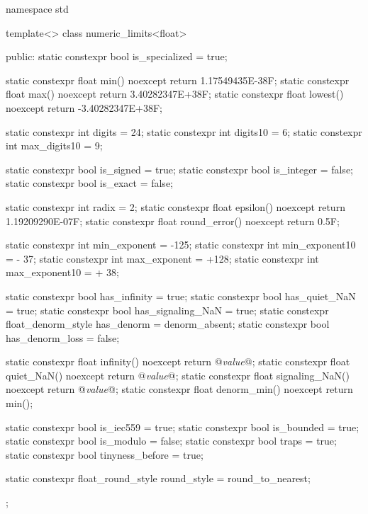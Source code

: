 \pnum
\begin{example}
\begin{codeblock}
namespace std {
  template<> class numeric_limits<float> {
  public:
    static constexpr bool is_specialized = true;

    static constexpr float min() noexcept { return 1.17549435E-38F; }
    static constexpr float max() noexcept { return 3.40282347E+38F; }
    static constexpr float lowest() noexcept { return -3.40282347E+38F; }

    static constexpr int digits   = 24;
    static constexpr int digits10 =  6;
    static constexpr int max_digits10 =  9;

    static constexpr bool is_signed  = true;
    static constexpr bool is_integer = false;
    static constexpr bool is_exact   = false;

    static constexpr int radix = 2;
    static constexpr float epsilon() noexcept     { return 1.19209290E-07F; }
    static constexpr float round_error() noexcept { return 0.5F; }

    static constexpr int min_exponent   = -125;
    static constexpr int min_exponent10 = - 37;
    static constexpr int max_exponent   = +128;
    static constexpr int max_exponent10 = + 38;

    static constexpr bool has_infinity             = true;
    static constexpr bool has_quiet_NaN            = true;
    static constexpr bool has_signaling_NaN        = true;
    static constexpr float_denorm_style has_denorm = denorm_absent;
    static constexpr bool has_denorm_loss          = false;

    static constexpr float infinity()      noexcept { return @\textit{value}@; }
    static constexpr float quiet_NaN()     noexcept { return @\textit{value}@; }
    static constexpr float signaling_NaN() noexcept { return @\textit{value}@; }
    static constexpr float denorm_min()    noexcept { return min(); }

    static constexpr bool is_iec559  = true;
    static constexpr bool is_bounded = true;
    static constexpr bool is_modulo  = false;
    static constexpr bool traps      = true;
    static constexpr bool tinyness_before = true;

    static constexpr float_round_style round_style = round_to_nearest;
  };
}
\end{codeblock}
\end{example}

